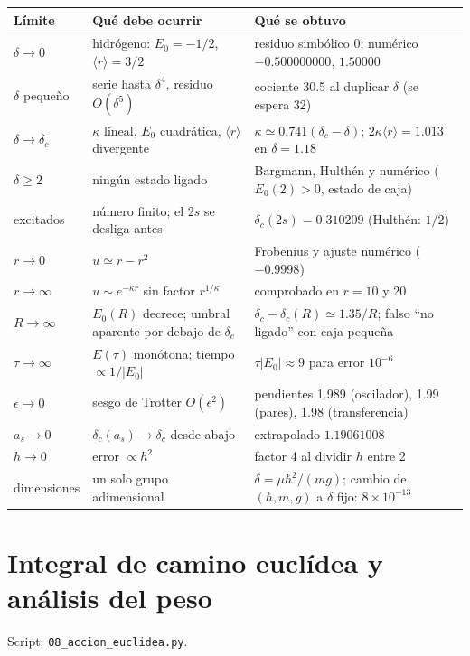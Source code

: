 \documentclass[11pt]{article}
\newcommand{\dc}{\delta_c}
\begin{document}
\begin{longtable}{@{}L{2.6cm}L{4.4cm}L{6.4cm}@{}}
\toprule
\textbf{Límite} & \textbf{Qué debe ocurrir} & \textbf{Qué se obtuvo}\\
\midrule
\endhead
$\delta\to0$ & hidrógeno: $E_0=-1/2$, $\langle r\rangle=3/2$ & residuo simbólico 0; numérico $-0.500000000$, $1.50000$\\
$\delta$ pequeño & serie hasta $\delta^4$, residuo $O(\delta^5)$ & cociente 30.5 al duplicar $\delta$ (se espera 32)\\
$\delta\to\dc^-$ & $\kappa$ lineal, $E_0$ cuadrática, $\langle r\rangle$ divergente & $\kappa\simeq0.741(\dc-\delta)$; $2\kappa\langle r\rangle=1.013$ en $\delta=1.18$\\
$\delta\ge2$ & ningún estado ligado & Bargmann, Hulthén y numérico ($E_0(2)>0$, estado de caja)\\
excitados & número finito; el $2s$ se desliga antes & $\dc(2s)=0.310209$ (Hulthén: $1/2$)\\
$r\to0$ & $u\simeq r-r^2$ & Frobenius y ajuste numérico ($-0.9998$)\\
$r\to\infty$ & $u\sim e^{-\kappa r}$ sin factor $r^{1/\kappa}$ & comprobado en $r=10$ y 20\\
$R\to\infty$ & $E_0(R)$ decrece; umbral aparente por debajo de $\dc$ & $\dc-\dc(R)\simeq1.35/R$; falso ``no ligado'' con caja pequeña\\
$\tau\to\infty$ & $E(\tau)$ monótona; tiempo $\propto1/|E_0|$ & $\tau|E_0|\approx9$ para error $10^{-6}$\\
$\epsilon\to0$ & sesgo de Trotter $O(\epsilon^2)$ & pendientes 1.989 (oscilador), 1.99 (pares), 1.98 (transferencia)\\
$a_s\to0$ & $\dc(a_s)\to\dc$ desde abajo & extrapolado $1.19061008$\\
$h\to0$ & error $\propto h^2$ & factor 4 al dividir $h$ entre 2\\
dimensiones & un solo grupo adimensional & $\delta=\mu\hbar^2/(mg)$; cambio de $(\hbar,m,g)$ a $\delta$ fijo: $8\times10^{-13}$\\
\bottomrule
\end{longtable}

\section{Integral de camino euclídea y análisis del peso}
\label{sec:accion}

Script: \texttt{08\_accion\_euclidea.py}.
\end{document}
